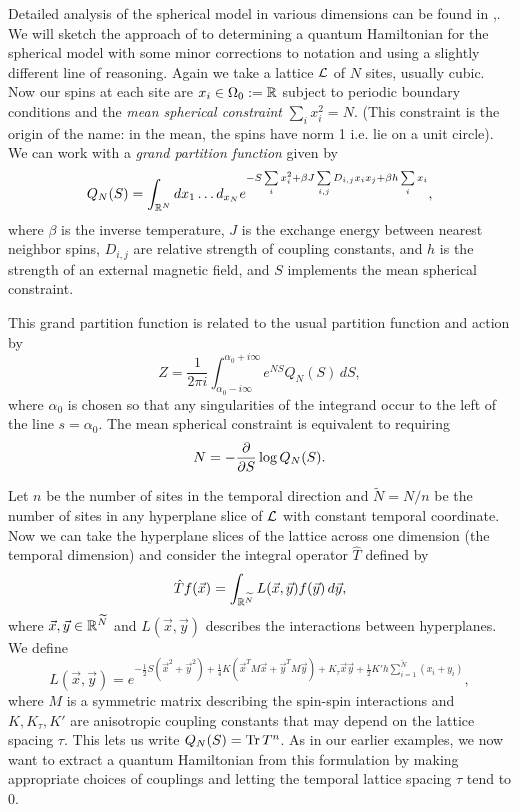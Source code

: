 \documentclass[11pt,reqno]{amsart}
\begin{document}
	Detailed analysis of the spherical model in various dimensions can be found in \cite{HenkelHoeger84},\cite{Thompson68}. 
	We will sketch the approach of \cite{HenkelHoeger84} to determining a quantum Hamiltonian for the spherical model with some minor corrections to notation and using a slightly different line of reasoning.
	Again we take a lattice $\mathcal{L}$ of $N$ sites, usually cubic.
	Now our spins at each site are $x_i \in \Omega_0 := \mathbb{R}$ subject to periodic boundary conditions and the \emph{mean spherical constraint} $\sum_{i} x_i^2 = N$. 
	(This constraint is the origin of the name: in the mean, the spins have norm 1 i.e. lie on a unit circle).
	We can work with a \emph{grand partition function} given by 
		\[ Q_N(S) = \int_{\mathbb{R}^N} dx_1\ldots d_{x_N} e^{-S\sum\limits_{i} x_i^2+\beta J \sum\limits_{i,j}D_{i,j} x_i x_j+\beta h \sum\limits_i x_i}, \]
	where $\beta$ is the inverse temperature, $J$ is the exchange energy between nearest neighbor spins, $D_{i,j}$ are relative strength of coupling constants, and $h$ is the strength of an external magnetic field, and $S$ implements the mean spherical constraint.
	
	This grand partition function is related to the usual partition function and action by 
		\[ Z = \frac{1}{2\pi i} \int_{\alpha_0-i\infty}^{\alpha_0+i\infty} e^{NS}Q_N(S)\, dS, \]
	where $\alpha_0$ is chosen so that any singularities of the integrand occur to the left of the line $s=\alpha_0$.
	The mean spherical constraint is equivalent to requiring 
		\[N=-\frac{\partial}{\partial S} \log Q_N(S). \]
	
	Let $n$ be the number of sites in the temporal direction and $\widetilde{N}=N/n$ be the number of sites in any hyperplane slice of $\mathcal{L}$ with constant temporal coordinate. Now we can take the hyperplane slices of the lattice across one dimension (the temporal dimension) and consider the integral operator $\hat{T}$ defined by 
		\[ \hat{T}f(\vec{x})=\int_{\mathbb{R}^{\widetilde{N}}} L(\vec{x},\vec{y})f(\vec{y}) \, d\vec{y},  \]
	where $\vec{x},\vec{y} \in \mathbb{R}^{\widetilde{N}}$ and $L(\vec{x},\vec{y})$ describes the interactions between hyperplanes.
	We define 
		\begin{equation}
			 L(\vec{x},\vec{y})=e^{-\frac{1}{2}S(\vec{x}^2+\vec{y}^2)+\frac{1}{4}K(\vec{x}^TM\vec{x}+\vec{y}^TM\vec{y})+K_\tau\vec{x}\vec{y}+\frac{1}{2}K'h \sum_{i=1}^{\widetilde{N}} (x_i + y_i)},
		\end{equation}
	where $M$ is a symmetric matrix describing the spin-spin interactions and $K,K_\tau,K'$ are anisotropic coupling constants that may depend on the lattice spacing $\tau$.
	This lets us write $Q_N(S)=\Tr T^n$. As in our earlier examples, we now want to extract a quantum Hamiltonian from this formulation by making appropriate choices of couplings and letting the temporal lattice spacing $\tau$ tend to 0.
	
\end{document}
